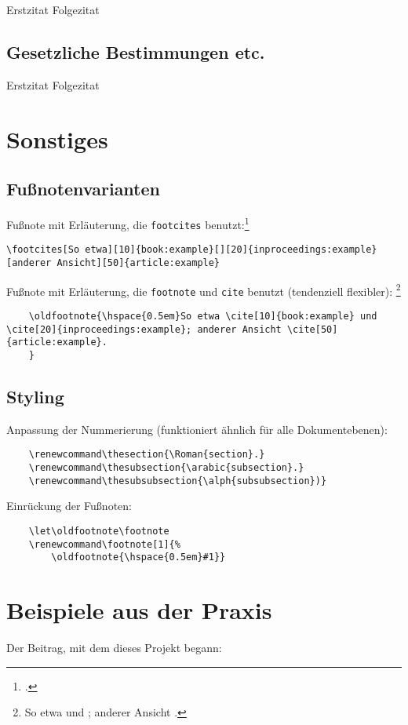 \documentclass[a4paper]{article}
\renewcommand\thesection{\Roman{section}.}
\renewcommand\thesubsection{\arabic{subsection}.}
\renewcommand\thesubsubsection{\alph{subsubsection})}
\let\oldfootnote\footnote
\renewcommand\footnote[1]{%
	\oldfootnote{\hspace{0.5em}#1}}
\begin{document}
Erstzitat
Folgezitat

\subsection{Gesetzliche Bestimmungen etc.}
	
Erstzitat
Folgezitat


\section{Sonstiges}

\subsection{Fußnotenvarianten}

Fußnote mit Erläuterung, die \texttt{footcites} benutzt:\footcites[So etwa][10]{book:example}[][20]{inproceedings:example}[anderer Ansicht][50]{article:example}

\begin{Verbatim}[breaklines=true]
	\footcites[So etwa][10]{book:example}[][20]{inproceedings:example}[anderer Ansicht][50]{article:example}
\end{Verbatim}

Fußnote mit Erläuterung, die \texttt{footnote} und \texttt{cite} benutzt (tendenziell flexibler):\footnote{So etwa \cite[10]{book:example} und \cite[20]{inproceedings:example}; anderer Ansicht \cite[50]{article:example}.
}

\begin{Verbatim}[breaklines=true]
	\footnote{So etwa \cite[10]{book:example} und \cite[20]{inproceedings:example}; anderer Ansicht \cite[50]{article:example}.
	}
\end{Verbatim}

\subsection{Styling}

Anpassung der Nummerierung (funktioniert ähnlich für alle Dokumentebenen):
\begin{Verbatim}
	\renewcommand\thesection{\Roman{section}.}
	\renewcommand\thesubsection{\arabic{subsection}.}
	\renewcommand\thesubsubsection{\alph{subsubsection})}
\end{Verbatim}

Einrückung der Fußnoten:
\begin{Verbatim}
	\let\oldfootnote\footnote
	\renewcommand\footnote[1]{%
		\oldfootnote{\hspace{0.5em}#1}}
\end{Verbatim}

\section{Beispiele aus der Praxis}

Der Beitrag, mit dem dieses Projekt begann:\\

\noindent\cite{coupette:2022:rechtsstrukturvergleichung}

\newpage

\printbibliography
\end{document}
